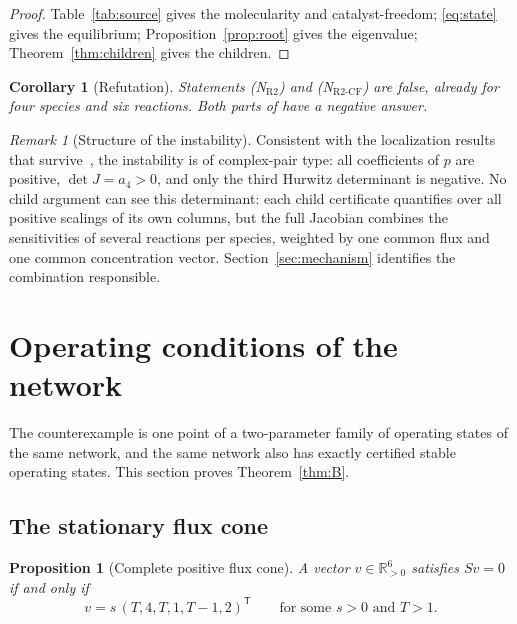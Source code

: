\documentclass[11pt,a4paper]{article}
\theoremstyle{plain}
\newtheorem{proposition}[theorem]{Proposition}
\newtheorem{corollary}[theorem]{Corollary}
\theoremstyle{definition}
\theoremstyle{remark}
\newtheorem{remark}[theorem]{Remark}
\newcommand{\R}{\mathbb{R}}
\newcommand{\Ract}{\mathrm{R2}}
\newcommand{\Rcf}{\mathrm{R2\text{-}CF}}
\begin{document}
\begin{proof}
Table~\ref{tab:source} gives the molecularity and catalyst-freedom; \eqref{eq:state} gives the equilibrium; Proposition~\ref{prop:root} gives the eigenvalue; Theorem~\ref{thm:children} gives the children.
\end{proof}

\begin{corollary}[Refutation]\label{cor:refutation}
Statements (N$_{\Ract}$) and (N$_{\Rcf}$) are false, already for four species and six reactions. Both parts of \cite[Question~8.1]{KineticOrder2026} have a negative answer.
\end{corollary}

\begin{remark}[Structure of the instability]
Consistent with the localization results that survive~\cite{ParameterRich2026,KineticOrder2026}, the instability is of complex-pair type: all coefficients of $p$ are positive, $\det J=a_4>0$, and only the third Hurwitz determinant is negative. No child argument can see this determinant: each child certificate quantifies over all positive scalings of its own columns, but the full Jacobian combines the sensitivities of several reactions per species, weighted by one common flux and one common concentration vector. Section~\ref{sec:mechanism} identifies the combination responsible.
\end{remark}

\section{Operating conditions of the network}\label{sec:family}

The counterexample is one point of a two-parameter family of operating states of the same network, and the same network also has exactly certified stable operating states. This section proves Theorem~\ref{thm:B}.

\subsection{The stationary flux cone}

\begin{proposition}[Complete positive flux cone]\label{prop:cone}
A vector $v\in\R^6_{>0}$ satisfies $Sv=0$ if and only if
\begin{equation}\label{eq:cone}
v=s\,(T,4,T,1,T-1,2)^{\mathsf T}\qquad\text{for some } s>0 \text{ and } T>1 .
\end{equation}
\end{proposition}
\end{document}
